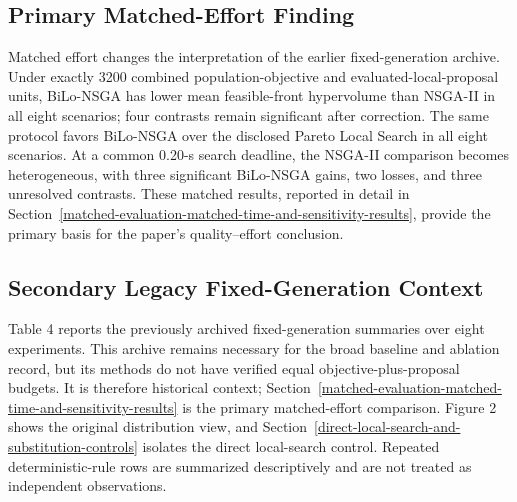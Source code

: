 \documentclass[applsci,article,submit,moreauthors]{Definitions/mdpi}
\begin{document}
\subsection{Primary Matched-Effort Finding}\label{primary-matched-effort-finding}

Matched effort changes the interpretation of the earlier fixed-generation archive. Under exactly 3200 combined population-objective and evaluated-local-proposal units, BiLo-NSGA has lower mean feasible-front hypervolume than NSGA-II in all eight scenarios; four contrasts remain significant after correction. The same protocol favors BiLo-NSGA over the disclosed Pareto Local Search in all eight scenarios. At a common 0.20-s search deadline, the NSGA-II comparison becomes heterogeneous, with three significant BiLo-NSGA gains, two losses, and three unresolved contrasts. These matched results, reported in detail in Section~\ref{matched-evaluation-matched-time-and-sensitivity-results}, provide the primary basis for the paper's quality--effort conclusion.

\subsection{Secondary Legacy Fixed-Generation Context}\label{legacy-fixed-generation-comparison}

Table 4 reports the previously archived fixed-generation summaries over eight experiments. This archive remains necessary for the broad baseline and ablation record, but its methods do not have verified equal objective-plus-proposal budgets. It is therefore historical context; Section~\ref{matched-evaluation-matched-time-and-sensitivity-results} is the primary matched-effort comparison. Figure 2 shows the original distribution view, and Section~\ref{direct-local-search-and-substitution-controls} isolates the direct local-search control. Repeated deterministic-rule rows are summarized descriptively and are not treated as independent observations.
\end{document}
